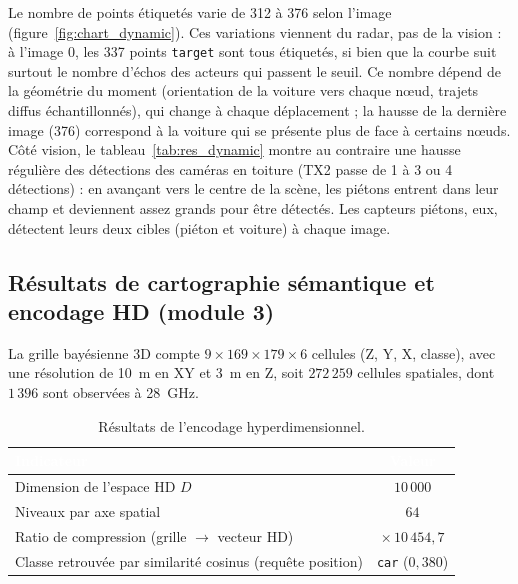 \documentclass[12pt,a4paper,titlepage]{article}
\newcommand{\hd}[1]{\textcolor{white}{\textbf{#1}}}
\begin{document}
Le nombre de points étiquetés varie de 312 à 376 selon l'image (figure~\ref{fig:chart_dynamic}). Ces variations viennent du radar, pas de la vision : à l'image 0, les 337 points \texttt{target} sont tous étiquetés, si bien que la courbe suit surtout le nombre d'échos des acteurs qui passent le seuil. Ce nombre dépend de la géométrie du moment (orientation de la voiture vers chaque n\oe ud, trajets diffus échantillonnés), qui change à chaque déplacement ; la hausse de la dernière image (376) correspond à la voiture qui se présente plus de face à certains n\oe uds. Côté vision, le tableau~\ref{tab:res_dynamic} montre au contraire une hausse régulière des détections des caméras en toiture (TX2 passe de 1 à 3 ou 4 détections) : en avançant vers le centre de la scène, les piétons entrent dans leur champ et deviennent assez grands pour être détectés. Les capteurs piétons, eux, détectent leurs deux cibles (piéton et voiture) à chaque image.

\subsection{Résultats de cartographie sémantique et encodage HD (module 3)}
\label{subsec:res_phase4}

La grille bayésienne 3D compte $9 \times 169 \times 179 \times 6$ cellules (Z, Y, X, classe), avec une résolution de 10~m en XY et 3~m en Z, soit $272\,259$ cellules spatiales, dont $1\,396$ sont observées à 28~GHz.

\begin{table}[H]
    \centering
    \caption{Résultats de l'encodage hyperdimensionnel.}
    \begin{tabular}{lc}
        \toprule
        \rowcolor{tabhead}
        \hd{Indicateur} & \hd{Valeur} \\
        \midrule
        Dimension de l'espace HD $D$ & $10\,000$ \\
        Niveaux par axe spatial & $64$ \\
        Ratio de compression (grille $\to$ vecteur HD) & $\times\,10\,454{,}7$ \\
        Classe retrouvée par similarité cosinus (requête position) & \texttt{car} ($0{,}380$) \\
        \bottomrule
    \end{tabular}
\end{table}
\end{document}
